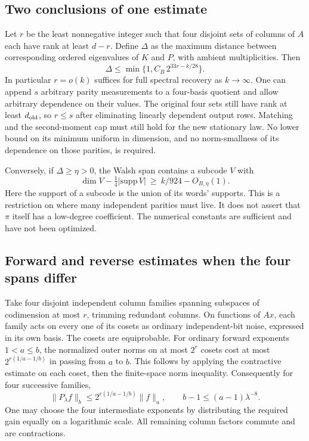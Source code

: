 \documentclass[11pt]{article}
\begin{document}
\subsection{Two conclusions of one estimate}

Let \(r\) be the least nonnegative integer such that four disjoint sets of columns of \(A\) each have rank at least \(d-r\). Define \(\Delta\) as the maximum distance between corresponding ordered eigenvalues of \(K\) and \(P\), with ambient multiplicities. Then
\[
 \Delta\le \min\{1,C_B\,2^{33r-k/28}\}.
\]
In particular \(r=o(k)\) suffices for full spectral recovery as \(k\to\infty\). One can append \(s\) arbitrary parity measurements to a four-basis quotient and allow arbitrary dependence on their values. The original four sets still have rank at least \(d_{\rm old}\), so \(r\le s\) after eliminating linearly dependent output rows. Matching and the second-moment cap must still hold for the new stationary law. No lower bound on its minimum uniform in dimension, and no norm-smallness of its dependence on those parities, is required.

Conversely, if \(\Delta\ge\eta>0\), the Walsh span contains a subcode \(V\) with
\[
 \dim V-\tfrac14|\mathrm{supp}\,V|
 \ \ge\ k/924-O_{B,\eta}(1).
\]
Here the support of a subcode is the union of its words' supports. This is a restriction on where many independent parities must live. It does not assert that \(\pi\) itself has a low-degree coefficient. The numerical constants are sufficient and have not been optimized.

\subsection{Forward and reverse estimates when the four spans differ}

Take four disjoint independent column families spanning subspaces of codimension at most \(r\), trimming redundant columns. On functions of \(Ax\), each family acts on every one of its cosets as ordinary independent-bit noise, expressed in its own basis. The cosets are equiprobable. For ordinary forward exponents \(1<a\le b\), the normalized outer norms on at most \(2^r\) cosets cost at most \(2^{r(1/a-1/b)}\) in passing from \(a\) to \(b\). This follows by applying the contractive estimate on each coset, then the finite-space norm inequality. Consequently for four successive families,
\[
 \|P_\lambda f\|_b\le 2^{r(1/a-1/b)}\|f\|_a,
 \qquad b-1\le(a-1)\lambda^{-8}.
\]
One may choose the four intermediate exponents by distributing the required gain equally on a logarithmic scale. All remaining column factors commute and are contractions.
\end{document}

